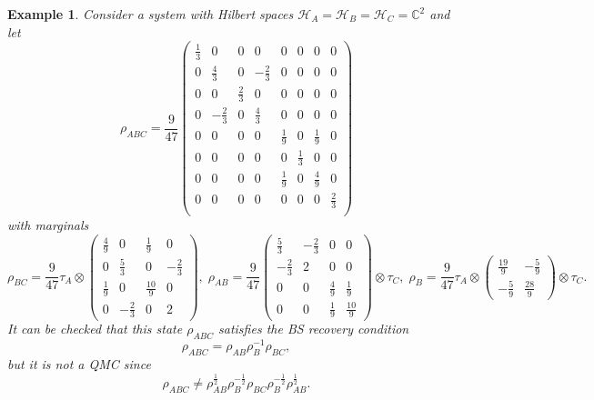 \documentclass[11pt]{article}
\theoremstyle{newdefinition}
\theoremstyle{newplain}
\newtheorem{example}[definition]{Example}
\theoremstyle{myplain}
\DeclareMathOperator{\1}{\mathds{1}}
\begin{document}
\begin{example}
Consider a system with Hilbert spaces $\mathcal{H}_A=\mathcal{H}_B=\mathcal{H}_C=\mathbb{C}^2$ and let
\begin{equation}
    \rho_{ABC}=\frac{9}{47} \begin{pmatrix}
       \frac{1}{3} & 0 &0 &0 &0&0&0&0\\
       0 &\frac{4}{3}&0&-\frac{2}{3}&0&0&0&0\\
       0 & 0 & \frac{2}{3} &0&0&0&0&0\\
       0 & -\frac{2}{3}& 0& \frac{4}{3}&0&0&0&0\\
       0&0&0&0&\frac{1}{9}&0&\frac{1}{9}&0\\
       0&0&0&0&0&\frac{1}{3}&0&0\\
       0&0&0&0&\frac{1}{9}&0&\frac{4}{9}&0\\
       0&0&0&0&0&0&0&\frac{2}{3}\\
    \end{pmatrix}
\end{equation}
with marginals
\begin{equation}
    \rho_{BC}=\frac{9}{47}\tau_A\otimes\begin{pmatrix}
        \frac{4}{9}&0 &\frac{1}{9}&0\\
        0&\frac{5}{3}&0&-\frac{2}{3}\\
        \frac{1}{9}&0&\frac{10}{9}&0\\
        0&-\frac{2}{3}&0&2
    \end{pmatrix},\; \rho_{AB}=\frac{9}{47}\begin{pmatrix}
        \frac{5}{3}& -\frac{2}{3}&0 &0\\
        -\frac{2}{3}&2&0&0\\
        0 &0 &\frac{4}{9}&\frac{1}{9}\\
        0&0&\frac{1}{9}&\frac{10}{9}
    \end{pmatrix}\otimes \tau_C, \; \rho_B=\frac{9}{47}\tau_A\otimes \begin{pmatrix}
        \frac{19}{9}&-\frac{5}{9}\\
        -\frac{5}{9}&\frac{28}{9}
    \end{pmatrix}\otimes \tau_C .
\end{equation}
It can be checked that this state $\rho_{ABC}$ satisfies the BS recovery condition
\begin{equation}
    \rho_{ABC}=\rho_{AB} \rho_B^{-1} \rho_{BC},
\end{equation}
but it is not a QMC since
\begin{equation}
    \rho_{ABC}\neq \rho_{AB}^{\frac{1}{2}}\rho_B^{-\frac{1}{2}}\rho_{BC}\rho_B^{-\frac{1}{2}}\rho_{AB}^{\frac{1}{2}}.
\end{equation}
    
\end{example}
\end{document}
